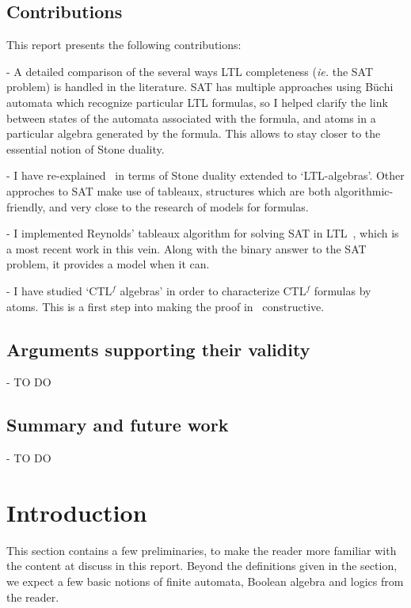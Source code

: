 \documentclass[11pt]{article}
\newcommand{\CTLf}{{CTL$^f$ }}
\begin{document}
\subsection*{Contributions}
This report presents the following contributions:

- A detailed comparison of the several ways LTL completeness
(\emph{ie.} the SAT problem) is handled
in the literature. SAT has 
multiple approaches using Büchi automata which recognize particular
LTL formulas, so I helped clarify the link between states
of the automata associated with the formula,
and atoms in a particular algebra generated by the formula.
This allows to stay closer to the essential notion of Stone duality.

- I have re-explained~\cite{GhivG17}
in terms of Stone duality extended to `LTL-algebras'. Other approches 
to SAT make use of tableaux, structures which are both algorithmic-friendly,
and very close to the research of models for formulas. 

- I implemented Reynolds' tableaux
algorithm for solving SAT in LTL~\cite{ReyLTL}, which is a most recent work in this vein.
Along with the binary answer to the SAT problem, it provides a model when
it can.

- I have studied `{\CTLf}algebras' in order to characterize
{\CTLf}formulas by atoms. This is a first step into making the proof in~\cite{GhivG16} constructive.



\subsection*{Arguments supporting their validity}
- TO DO



\subsection*{Summary and future work}
- TO DO
\newpage  

\section{Introduction}
This section contains a few preliminaries, to make the reader more familiar with the
content at discuss in this report. Beyond the definitions given in the section, we expect
a few basic notions of finite automata, Boolean algebra and  logics from the reader.
\end{document}
